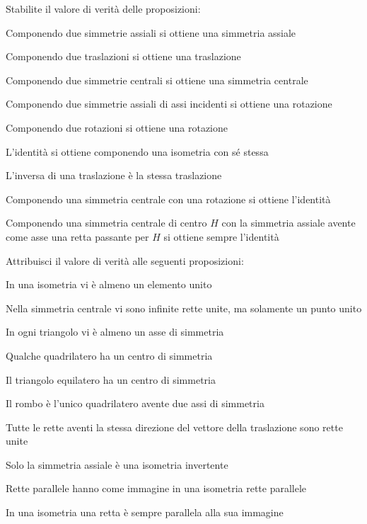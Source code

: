 \begin{esercizio}
\label{ese:8.86} %
Stabilite il valore di verità delle proposizioni:
\begin{enumeratea}
\item Componendo due simmetrie assiali si ottiene una simmetria 
assiale\hfill\boxV\quad\boxF
\item Componendo due traslazioni si ottiene una 
traslazione\hfill\boxV\quad\boxF
\item Componendo due simmetrie centrali si ottiene una simmetria 
centrale\hfill\boxV\quad\boxF
\item Componendo due simmetrie assiali di assi incidenti si ottiene 
una rotazione\hfill\boxV\quad\boxF
\item Componendo due rotazioni si ottiene una 
rotazione\hfill\boxV\quad\boxF
\item L'identità si ottiene componendo una isometria con sé 
stessa\hfill\boxV\quad\boxF
\item L'inversa di una traslazione è la stessa 
traslazione\hfill\boxV\quad\boxF
\item Componendo una simmetria centrale con una rotazione si ottiene 
l'identità\hfill\boxV\quad\boxF
\item Componendo una simmetria centrale di centro \(H\) con la 
simmetria assiale avente come asse una retta passante per \(H\) si 
ottiene sempre l'identità\hfill\boxV\quad\boxF
\end{enumeratea}
\end{esercizio}


\begin{esercizio}
\label{ese:8.90} %
Attribuisci il valore di verità alle seguenti proposizioni:
\begin{enumeratea}
\item In una isometria vi è almeno un elemento 
unito\hfill\boxV\quad\boxF
\item Nella simmetria centrale vi sono infinite rette unite, ma 
solamente un punto unito\tab\tab\hfill\boxV\quad\boxF
\item In ogni triangolo vi è almeno un asse di 
simmetria\hfill\boxV\quad\boxF
\item Qualche quadrilatero ha un centro di 
simmetria\hfill\boxV\quad\boxF
\item Il triangolo equilatero ha un centro di 
simmetria\hfill\boxV\quad\boxF
\item Il rombo è l'unico quadrilatero avente due assi di 
simmetria\hfill\boxV\quad\boxF
\item Tutte le rette aventi la stessa direzione del vettore della 
traslazione sono rette unite\tab\tab\hfill\boxV\quad\boxF
\item Solo la simmetria assiale è una isometria 
invertente\hfill\boxV\quad\boxF
\item Rette parallele hanno come immagine in una isometria rette 
parallele\hfill\boxV\quad\boxF
\item In una isometria una retta è sempre parallela alla sua 
immagine\hfill\boxV\quad\boxF
\end{enumeratea}
\end{esercizio}


